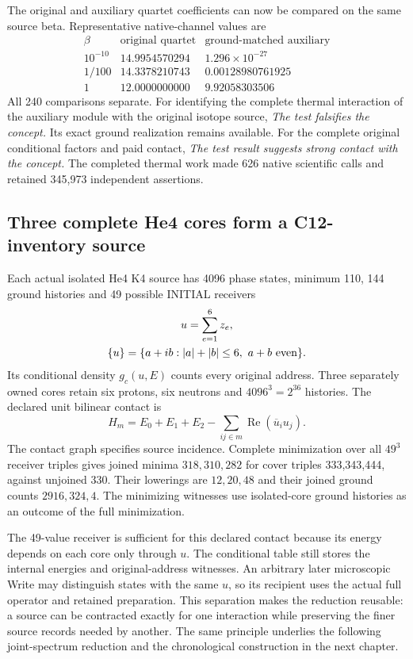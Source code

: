 The original and auxiliary quartet coefficients can now be compared on the
same source beta. Representative native-channel values are
\[
\begin{array}{c|rr}
\beta&\text{original quartet}&\text{ground-matched auxiliary}\\
\hline
10^{-10}&14.9954570294&1.296\times10^{-27}\\
1/100&14.3378210743&0.00128980761925\\
1&12.0000000000&9.92058303506
\end{array}
\]
All 240 comparisons separate. For identifying the complete thermal
interaction of the auxiliary module with the original isotope source,
\emph{The test falsifies the concept.} Its exact ground realization remains
available. For the complete original conditional factors and paid contact,
\emph{The test result suggests strong contact with the concept.}
The completed thermal work made 626 native scientific calls and retained
345,973 independent assertions.

\subsection{Three complete He4 cores form a C12-inventory source}

Each actual isolated He4 K4 source has 4096 phase states, minimum 110,
144 ground histories and 49 possible INITIAL receivers
\[
\begin{gathered}
u=\sum_{e=1}^{6}z_e,\\
 \{u\}=\{a+ib:|a|+|b|\leq6,\ a+b\ {\rm even}\}.
\end{gathered}
\]
Its conditional density \(g_c(u,E)\) counts every original address. Three
separately owned cores retain six protons, six neutrons and
\(4096^3=2^{36}\) histories. The declared unit bilinear contact is
\[
 H_m=E_0+E_1+E_2-\sum_{ij\in m}\operatorname{Re}(\overline u_i u_j).
\]
The contact graph specifies source incidence. Complete minimization over
all \(49^3\) receiver triples gives joined minima \(318,310,282\) for cover
triples 333,343,444, against unjoined 330. Their lowerings are \(12,20,48\)
and their joined ground counts \(2916,324,4\). The minimizing witnesses use
isolated-core ground histories as an outcome of the full minimization.

The 49-value receiver is sufficient for this declared contact because its
energy depends on each core only through \(u\). The conditional table still
stores the internal energies and original-address witnesses. An arbitrary
later microscopic Write may distinguish states with the same \(u\), so its
recipient uses the actual full operator and retained preparation. This
separation makes the reduction reusable: a source can be contracted exactly
for one interaction while preserving the finer source records needed by
another. The same principle underlies the following joint-spectrum reduction
and the chronological construction in the next chapter.

